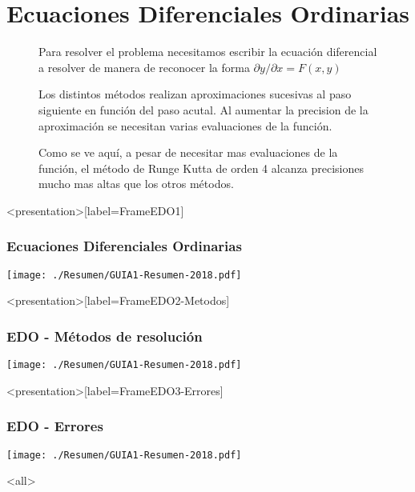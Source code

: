 \section{Ecuaciones Diferenciales Ordinarias}

\begin{figure}

  \caption{\protect\label{FiguraEDO1} Para resolver el problema necesitamos escribir 
  la ecuación diferencial a resolver de manera de reconocer la forma
  $\partial y / \partial x = F(x,y) $ }

\end{figure}

\begin{figure}
  \caption{\protect\label{FiguraEDO2-Metodos} 
  Los distintos métodos realizan aproximaciones sucesivas al paso siguiente 
  en función del paso acutal. Al aumentar la precision de la aproximación 
  se necesitan varias evaluaciones de la función. 
  }
\end{figure}
\begin{figure}

  \caption{\protect\label{FiguraEDO3-Errores} 
  Como se ve aquí, a pesar de necesitar mas evaluaciones de la función, el método de Runge
  Kutta de orden 4 alcanza precisiones mucho mas altas que los otros métodos. 
  }

\end{figure}
\mode*

\begin{frame}<presentation>[label=FrameEDO1]
  \frametitle{Ecuaciones Diferenciales Ordinarias}
\center
  \texttt{[image: ./Resumen/GUIA1-Resumen-2018.pdf]}

\end{frame}

\begin{frame}<presentation>[label=FrameEDO2-Metodos]
  \frametitle{EDO - Métodos de resolución}
\center
  \texttt{[image: ./Resumen/GUIA1-Resumen-2018.pdf]}
\end{frame}

\begin{frame}<presentation>[label=FrameEDO3-Errores]
  \frametitle{EDO - Errores}
\center
  \texttt{[image: ./Resumen/GUIA1-Resumen-2018.pdf]}
\end{frame}
\mode<all>
